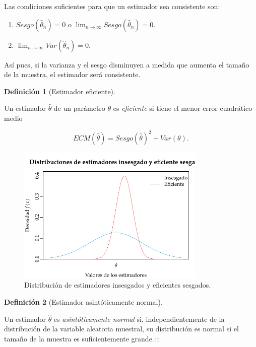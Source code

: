 \documentclass[
  a4paper,
]{scrreport}
\providecommand{\tightlist}{%
  \setlength{\itemsep}{0pt}\setlength{\parskip}{0pt}}\usepackage{longtable,booktabs,array}
\theoremstyle{definition}
\newtheorem{definition}{Definición}[chapter]
\theoremstyle{definition}
\theoremstyle{plain}
\theoremstyle{remark}
\begin{document}
Las condiciones suficientes para que un estimador sea consistente son:

\begin{enumerate}
\def\labelenumi{\arabic{enumi}.}
\tightlist
\item
  \(Sesgo(\hat \theta_n)=0\) o
  \(\lim_{n\rightarrow \infty}Sesgo(\hat \theta_n)=0\).
\item
  \(\lim_{n\rightarrow \infty}Var(\hat \theta_n)=0\).
\end{enumerate}

Así pues, si la varianza y el sesgo disminuyen a medida que aumenta el
tamaño de la muestra, el estimador será consistente.

\begin{definition}[Estimador
eficiente]\protect\hypertarget{def-estimador-eficiente}{}\label{def-estimador-eficiente}

Un estimador \(\hat \theta\) de un parámetro \(\theta\) es
\emph{eficiente} si tiene el menor error cuadrático medio

\[
ECM(\hat \theta) = Sesgo(\hat \theta)^2+Var(\theta).
\]

\end{definition}

\begin{figure}

{\centering \includegraphics[width=0.8\textwidth,height=\textheight]{img/estimacion/estimador-eficiente-sesgado.pdf}

}

\caption{Distribución de estimadores insesgados y eficientes sesgados.}

\end{figure}

\begin{definition}[Estimador asintóticamente
normal]\protect\hypertarget{def-estimador-asintóticamente-normal}{}\label{def-estimador-asintóticamente-normal}

Un estimador \(\hat \theta\) es \emph{asintóticamente normal} si,
independientemente de la distribución de la variable aleatoria muestral,
su distribución es normal si el tamaño de la muestra es suficientemente
grande.:::

\end{definition}
\end{document}
